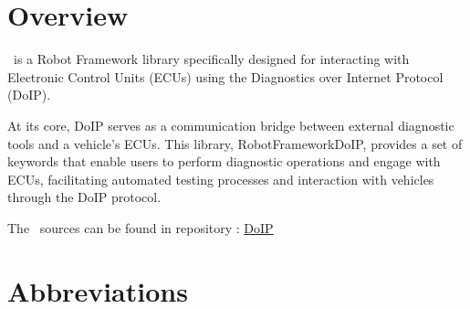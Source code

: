 %



%


\section{Overview}

\pkg\ is a Robot Framework library specifically designed for interacting with Electronic Control Units (ECUs) using 
the Diagnostics over Internet Protocol (DoIP).

At its core, DoIP serves as a communication bridge between external diagnostic tools and a vehicle's ECUs. This library, RobotFrameworkDoIP, 
provides a set of keywords that enable users to perform diagnostic operations and engage with ECUs, facilitating automated testing processes 
and interaction with vehicles through the DoIP protocol.

The \pkg\ sources can be found in repository \repo:
\href{https://github.com/test-fullautomation/robotframework-doip}{DoIP}


\section{Abbreviations}

